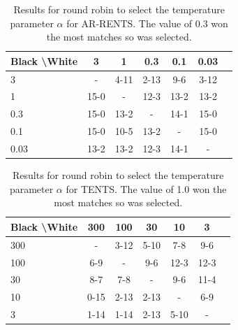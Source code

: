 \documentclass{article}
\theoremstyle{plain}
\begin{document}
\begin{appendices}
            \begin{table}[]
            \centering
                \begin{tabular}{l|cccccc}
                    \textbf{Black \textbackslash White}     & 3  & 1   & 0.3   & 0.1    & 0.03    \\ 
                    \hline
                                            3            & -     	&  4-11 		&  2-13 		& 9-6  		& 3-12  		\\
                                            1            &  15-0 		& -     	&  12-3		& 13-2  		&   13-2		\\
                                            0.3          &  15-0  	&  13-2  	&   -   &  14-1 		&  15-0 		\\
                                            0.1          &  15-0 		&   10-5		&   13-2		& -     	&  15-0 		\\
                                            0.03         &  13-2 		&  13-2 		&  12-3 		&   	14-1	&   -   	\\    
                \end{tabular}
                \caption{Results for round robin to select the temperature parameter $\alpha$ for AR-RENTS. The value of 0.3 won the most matches so was selected. \label{tab:x050}}
            \end{table}
            
            \begin{table}[]
            \centering
                \begin{tabular}{l|cccccc}
                    \textbf{Black \textbackslash White}     & 300  & 100   & 30   & 10    & 3    \\ 
                    \hline
                                            300            & -     	&  3-12 		&  5-10 		&  7-8 		& 9-6  		\\
                                            100            &  6-9 		& -     	&  9-6		&  12-3 		& 12-3  		\\
                                            30          & 8-7   	&  7-8  	&   -   &  9-6 		&  11-4 		\\
                                            10          &  0-15 		&  2-13 		& 2-13  		& -     	& 6-9  		\\
                                            3         &  1-14 		& 1-14  		& 2-13  		&  5-10 		&   -   	\\    
                \end{tabular}
                \caption{Results for round robin to select the temperature parameter $\alpha$ for TENTS. The value of 1.0 won the most matches so was selected. \label{tab:w060}}
            \end{table}
            

\end{appendices}
\end{document}
